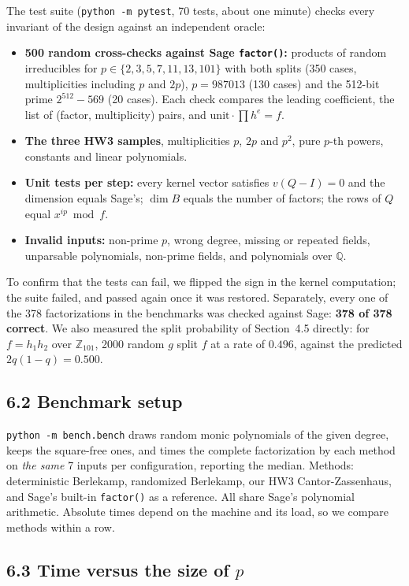 \documentclass[11pt,a4paper]{article}
\begin{document}
The test suite (\texttt{python -m pytest}, 70 tests, about one minute) checks every invariant
of the design against an independent oracle:
\begin{itemize}
    \item \textbf{500 random cross-checks against Sage \texttt{factor()}:} products of random irreducibles for $p \in \{2, 3, 5, 7, 11, 13, 101\}$ with both splits (350 cases, multiplicities including $p$ and $2p$), $p = 987013$ (130 cases) and the 512-bit prime $2^{512} - 569$ (20 cases). Each check compares the leading coefficient, the list of (factor, multiplicity) pairs, and $\text{unit} \cdot \prod h^e = f$.
    \item \textbf{The three HW3 samples}, multiplicities $p$, $2p$ and $p^2$, pure $p$-th powers, constants and linear polynomials.
    \item \textbf{Unit tests per step:} every kernel vector satisfies $v(Q - I) = 0$ and the dimension equals Sage's; $\dim B$ equals the number of factors; the rows of $Q$ equal $x^{ip} \bmod f$.
    \item \textbf{Invalid inputs:} non-prime $p$, wrong degree, missing or repeated fields, unparsable polynomials, non-prime fields, and polynomials over $\mathbb{Q}$.
\end{itemize}
To confirm that the tests can fail, we flipped the sign in the kernel computation; the suite
failed, and passed again once it was restored. Separately, every one of the 378 factorizations in
the benchmarks was checked against Sage: \textbf{378 of 378 correct}. We also measured the split
probability of Section~4.5 directly: for $f = h_1 h_2$ over $\mathbb{Z}_{101}$, 2000 random $g$
split $f$ at a rate of $0.496$, against the predicted $2q(1-q) = 0.500$.

\subsection*{6.2 Benchmark setup}

\texttt{python -m bench.bench} draws random monic polynomials of the given degree, keeps the
square-free ones, and times the complete factorization by each method on \emph{the same} 7 inputs
per configuration, reporting the median. Methods: deterministic Berlekamp, randomized Berlekamp, our
HW3 Cantor-Zassenhaus, and Sage's built-in \texttt{factor()} as a reference. All share Sage's
polynomial arithmetic. Absolute times depend on the machine and its load, so we compare methods
within a row.

\subsection*{6.3 Time versus the size of $p$}
\end{document}
